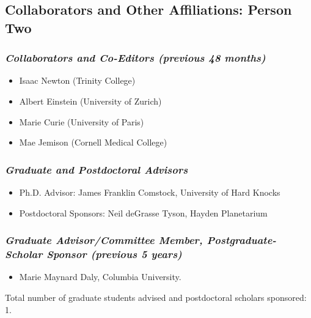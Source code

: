 \subsection*{Collaborators and Other Affiliations: Person Two}

\subsubsection*{\textit{Collaborators and Co-Editors (previous 48 months)}}
\begin{itemize}
\item Isaac Newton (Trinity College)
\item Albert Einstein (University of Zurich)
\item Marie Curie (University of Paris)
\item Mae Jemison (Cornell Medical College)
\end{itemize}

\subsubsection*{\textit{Graduate and Postdoctoral Advisors}}
\begin{itemize}
\item Ph.D. Advisor: James Franklin Comstock, University of Hard Knocks
\item Postdoctoral Sponsors: Neil deGrasse Tyson, Hayden Planetarium
\end{itemize}
\subsubsection*{\textit{Graduate Advisor/Committee Member, Postgraduate-Scholar Sponsor (previous 5 years)}}
\begin{itemize}
\item Marie Maynard Daly, Columbia University.
\end{itemize}
Total number of graduate students advised and postdoctoral scholars sponsored: 1.